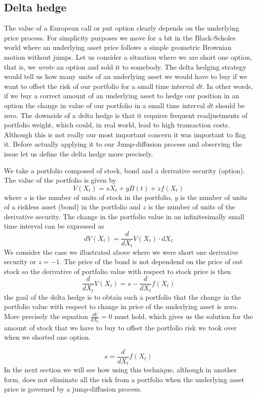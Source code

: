 \documentclass[times, utf8, diplomski]{fer}
\begin{document}
\subsection{Delta hedge} \label{sec:delta_hedge}
The value of a European call or put option clearly depends on the underlying price process. For simplicity purposes we move for a bit in the Black-Scholes world where an underlying asset price follows a simple geometric Brownian motion without jumps. Let us consider a situation where we are short one option, that is, we \textit{wrote} an option and sold it to somebody. The delta hedging strategy would tell us how many units of an underlying asset we would have to buy if we want to offset the risk of our portfolio for a small time interval $dt$. In other words, if we buy a correct amount of an underlying asset to hedge our position in an option the change in value of our portfolio in a small time interval $dt$ should be zero. The downside of a delta hedge is that it requires frequent readjustments of portfolio weight, which could, in real world, lead to high transaction costs. Although this is not really our most important concern it was important to flag it. Before actually applying it to our Jump-diffusion process and observing the issue let us define the delta hedge more precisely.

We take a portfolio composed of stock, bond and a derivative security (option). The value of the portfolio is given by
$$ V(X_t) = sX_t + yB(t) + zf(X_t)$$
where $s$ is the number of units of stock in the portfolio, $y$ is the number of units of a riskless asset (bond) in the portfolio and $z$ is the number of units of the derivative security.
The change in the portfolio value in an infinitesimally small time interval can be expressed as
$$
	dV(X_t) = \frac{d}{dX_t}V(X_t) \cdot dX_t
$$ We consider the case we illustrated above where we were short one derivative security or $z=-1$. The price of the bond is not dependend on the price of out stock so the derivative of portfolio value with respect to stock price is then $$ \frac{d}{dX_t}V(X_t) = s - \frac{d}{dX_t}f(X_t) $$ the goal of the delta hedge is to obtain such a portfolio that the change in the portfolio value with respect to change in price of the underlying asset is zero. More precisely the equation $\frac{dV}{dX_t} = 0$ must hold, which gives us the solution for the amount of stock that we have to buy to offset the portfolio risk we took over when we shorted one option. 

\begin{equation}
	s = \frac{d}{dX_t}f(X_t)
\end{equation} In the next section we will see how using this technique, although in another form, does not eliminate all the risk from a portfolio when the underlying asset price is governed by a jump-diffusion process. 
\end{document}
